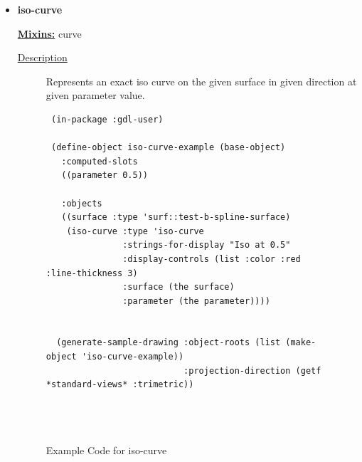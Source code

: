\documentclass [11pt]{book}
\begin{document}
\begin{itemize}
\begin{description}
\end{description}









\item {}
\label{prim:iso-curve}
\textbf{iso-curve}


\textbf{
\underline{Mixins:}} curve





\begin{description}

\item [
\underline{Description}]


Represents an exact iso curve on the given surface in given direction at given parameter value.



\end{description}




\begin{figure}
\begin{lrbox}{\boxedverb}
\begin{minipage}{\linewidth}
{\small

\begin{verbatim}
 (in-package :gdl-user)

 (define-object iso-curve-example (base-object)
   :computed-slots
   ((parameter 0.5))
  
   :objects
   ((surface :type 'surf::test-b-spline-surface)
    (iso-curve :type 'iso-curve
               :strings-for-display "Iso at 0.5"
               :display-controls (list :color :red :line-thickness 3)
               :surface (the surface)
               :parameter (the parameter))))


  (generate-sample-drawing :object-roots (list (make-object 'iso-curve-example))
                           :projection-direction (getf *standard-views* :trimetric))

                  
 
\end{verbatim}}
\end{minipage}
\end{lrbox}
\fbox{\usebox{\boxedverb}}

\caption{Example Code for iso-curve}

\label{fig:example-code-iso-curve}

\end{figure}


\end{itemize}
\end{document}
